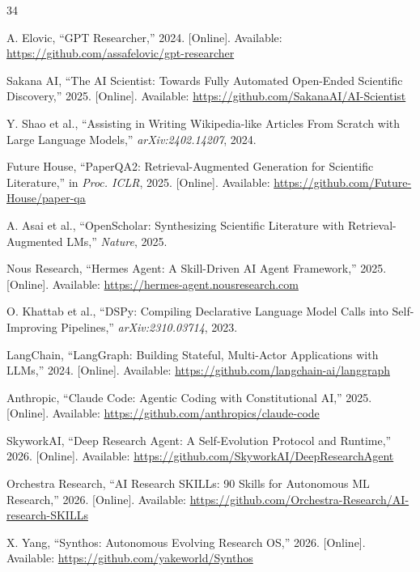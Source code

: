 \documentclass[review]{elsarticle}
\begin{document}
\begin{thebibliography}{34}

A. Elovic, ``GPT Researcher,'' 2024. [Online]. Available: \url{https://github.com/assafelovic/gpt-researcher}

Sakana AI, ``The AI Scientist: Towards Fully Automated Open-Ended Scientific Discovery,'' 2025. [Online]. Available: \url{https://github.com/SakanaAI/AI-Scientist}

Y. Shao et al., ``Assisting in Writing Wikipedia-like Articles From Scratch with Large Language Models,'' \textit{arXiv:2402.14207}, 2024.

Future House, ``PaperQA2: Retrieval-Augmented Generation for Scientific Literature,'' in \textit{Proc. ICLR}, 2025. [Online]. Available: \url{https://github.com/Future-House/paper-qa}

A. Asai et al., ``OpenScholar: Synthesizing Scientific Literature with Retrieval-Augmented LMs,'' \textit{Nature}, 2025.

Nous Research, ``Hermes Agent: A Skill-Driven AI Agent Framework,'' 2025. [Online]. Available: \url{https://hermes-agent.nousresearch.com}

O. Khattab et al., ``DSPy: Compiling Declarative Language Model Calls into Self-Improving Pipelines,'' \textit{arXiv:2310.03714}, 2023.

LangChain, ``LangGraph: Building Stateful, Multi-Actor Applications with LLMs,'' 2024. [Online]. Available: \url{https://github.com/langchain-ai/langgraph}

Anthropic, ``Claude Code: Agentic Coding with Constitutional AI,'' 2025. [Online]. Available: \url{https://github.com/anthropics/claude-code}

SkyworkAI, ``Deep Research Agent: A Self-Evolution Protocol and Runtime,'' 2026. [Online]. Available: \url{https://github.com/SkyworkAI/DeepResearchAgent}

Orchestra Research, ``AI Research SKILLs: 90 Skills for Autonomous ML Research,'' 2026. [Online]. Available: \url{https://github.com/Orchestra-Research/AI-research-SKILLs}

X. Yang, ``Synthos: Autonomous Evolving Research OS,'' 2026. [Online]. Available: \url{https://github.com/yakeworld/Synthos}


\end{thebibliography}
\end{document}
